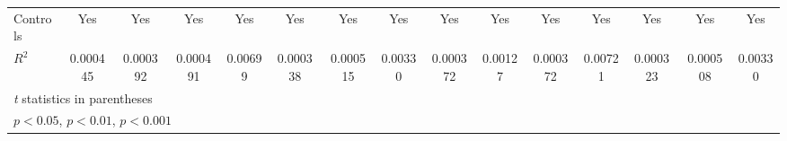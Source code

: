 {\begin{tabular}{l*{14}{c}}
Controls        &      Yes         &      Yes         &      Yes         &      Yes         &      Yes         &      Yes         &      Yes         &      Yes         &      Yes         &      Yes         &      Yes         &      Yes         &      Yes         &      Yes         \\
$ R^2 $         & 0.000445         & 0.000392         & 0.000491         &  0.00699         & 0.000338         & 0.000515         &  0.00330         & 0.000372         &  0.00127         & 0.000372         &  0.00721         & 0.000323         & 0.000508         &  0.00330         \\
\hline\hline
\multicolumn{15}{l}{\footnotesize \textit{t} statistics in parentheses}\\
\multicolumn{15}{l}{\footnotesize \sym{*} \(p<0.05\), \sym{**} \(p<0.01\), \sym{***} \(p<0.001\)}\\
\end{tabular}
}
